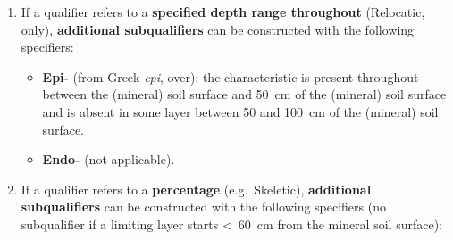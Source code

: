 \documentclass[
  letterpaper,
  DIV=11,
  numbers=noendperiod]{scrreprt}
\providecommand{\tightlist}{%
  \setlength{\itemsep}{0pt}\setlength{\parskip}{0pt}}\usepackage{longtable,booktabs,array}
\begin{document}
\begin{enumerate}
\def\labelenumi{\arabic{enumi}.}
\setcounter{enumi}{3}
\tightlist
\item
  If a qualifier refers to a \textbf{specified depth range throughout}
  (Relocatic, only), \textbf{additional subqualifiers} can be
  constructed with the following specifiers:

  \begin{itemize}
  \tightlist
  \item
    \textbf{Epi-} (from Greek \emph{epi}, over): the characteristic is
    present throughout between the (mineral) soil surface and 50~cm of
    the (mineral) soil surface and is absent in some layer between 50
    and 100~cm of the (mineral) soil surface.
  \item
    \textbf{Endo-} (not applicable).
  \end{itemize}
\item
  If a qualifier refers to a \textbf{percentage} (e.g.~Skeletic),
  \textbf{additional subqualifiers} can be constructed with the
  following specifiers (no subqualifier if a limiting layer starts
  \textless~60~cm from the mineral soil surface):


\end{enumerate}
\end{document}
